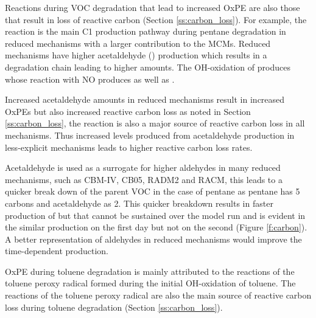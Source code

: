 Reactions during VOC degradation that lead to increased OxPE are also those that result in loss of reactive carbon (Section \ref{ss:carbon_loss}).
For example, the  reaction is the main C1  production pathway during pentane degradation in reduced mechanisms with a larger contribution to the MCMs.
Reduced mechanisms have higher acetaldehyde () production which results in a degradation chain leading to higher  amounts.
The OH-oxidation of  produces  whose reaction with NO produces  as well as .

Increased acetaldehyde amounts in reduced mechanisms result in increased OxPEs but also increased reactive carbon loss as noted in Section \ref{ss:carbon_loss}, the  reaction is also a major source of reactive carbon loss in all mechanisms. 
Thus increased  levels produced from acetaldehyde production in less-explicit mechanisms leads to higher reactive carbon loss rates.

Acetaldehyde is used as a surrogate for higher aldehydes in many reduced mechanisms, such as CBM-IV, CB05, RADM2 and RACM, this leads to a quicker break down of the parent VOC in the case of pentane as pentane has 5 carbons and acetaldehyde as 2.
This quicker breakdown results in faster production of  but that cannot be sustained over the model run and is evident in the similar  production on the first day but not on the second (Figure \ref{f:carbon}).
A better representation of aldehydes in reduced mechanisms would improve the time-dependent  production.

OxPE during toluene degradation is mainly attributed to the reactions of the toluene peroxy radical formed during the initial OH-oxidation of toluene.
The reactions of the toluene peroxy radical are also the main source of reactive carbon loss during toluene degradation (Section \ref{ss:carbon_loss}).
